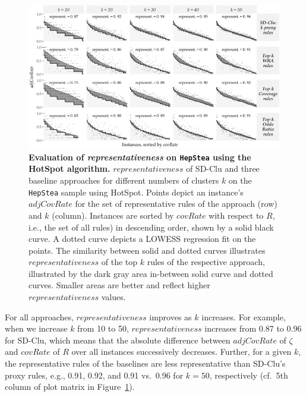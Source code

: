 \documentclass[
  oneside]{book}
\begin{document}
\begin{figure}[htb]

{\centering \includegraphics[width=1\linewidth]{figures/04-representativeness-hepStea-hotSpot} 

}

\caption{\textbf{Evaluation of \emph{representativeness} on \texttt{HepStea} using the HotSpot algorithm.} \(representativeness\) of SD-Clu and three baseline approaches for different numbers of clusters \(k\) on the \texttt{HepStea} sample using HotSpot. Points depict an instance's \(adjCovRate\) for the set of representative rules of the approach (row) and \(k\) (column). Instances are sorted by \(covRate\) with respect to \(R\), i.e., the set of all rules) in descending order, shown by a solid black curve. A dotted curve depicts a LOWESS regression fit on the points. The similarity between solid and dotted curves illustrates \(representativeness\) of the top \(k\) rules of the respective approach, illustrated by the dark gray area in-between solid curve and dotted curves. Smaller areas are better and reflect higher \(representativeness\) values.}\label{fig:04-representativeness-hepStea-hotSpot}
\end{figure}

For all approaches, \(representativeness\) improves as \(k\) increases.
For example, when we increase \(k\) from 10 to 50, \(representativeness\) increases from 0.87 to 0.96 for SD-Clu, which means that the absolute difference between \(adjCovRate\) of \(\zeta\) and \(covRate\) of \(R\) over all instances successively decreases.
Further, for a given \(k\), the representative rules of the baselines are less representative than SD-Clu's proxy rules, e.g., 0.91, 0.92, and 0.91 vs.~0.96 for \(k=50\), respectively (cf.~5th column of plot matrix in Figure~\ref{fig:04-representativeness-hepStea-hotSpot}).
\end{document}
